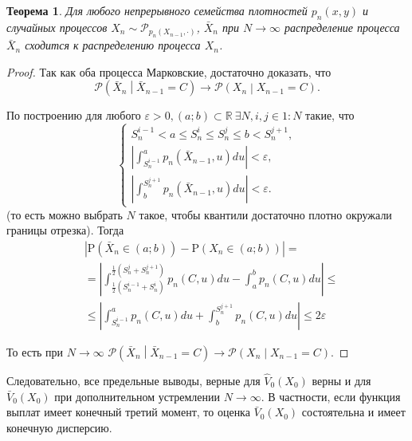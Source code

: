 \documentclass[specialist,
               substylefile = ../spbu.rtx,
               subf,href,colorlinks=true, 12pt]{disser}
\newtheorem{theorem}{Теорема}
\newcommand{\veps}{\varepsilon}
\newcommand{\prob}[1]{\mathrm{P}\left(#1\right)}
\newcommand{\R}{\ensuremath{\mathbb{R}}}
\newcommand{\Vhat}{\hat{V}}
\newcommand{\Vbar}{\bar{V}}
\begin{document}
    \begin{theorem}
        Для любого непрерывного семейства плотностей $p_n\left(x, y\right)$ и случайных процессов $X_n \sim \mathcal P_{p_n\left(X_{n-1}, \cdot\right)}$, $\bar X_n$ при $N\to\infty$ распределение процесса $\bar X_n$ сходится к распределению процесса $X_n$.
    \end{theorem}
    \begin{proof} 
        Так как оба процесса Марковские, достаточно доказать, что 
        $$\mathcal P\left(\bar X_n\middle\vert \bar X_{n-1} = C\right) \to \mathcal P\left(X_n\middle\vert X_{n-1} = C\right).$$

        По построению для любого $\veps > 0, \left( a; b\right) \subset \R \: \exists N, i, j \in 1\mathbin : N$ такие, что 
        $$ \begin{cases}
        S_n^{i-1} < a \leq S_n^i \leq S_n^j \leq b < S_n^{j+1}, \\
        \left\vert\int_{S_n^{i-1}}^a p_n\left(\bar X_{n-1}, u\right) du\right\vert < \veps, \\
        \left\vert\int_{b}^{S_n^{j+1}} p_n\left(\bar X_{n-1}, u\right) du \right\vert< \veps.
        \end{cases} $$
        (то есть можно выбрать $N$ такое, чтобы квантили достаточно плотно окружали границы отрезка). Тогда 
        \begin{align*}
            &\left\vert 
                \prob{\bar X_n \in \left( a; b\right)} - 
                \prob{X_n \in \left( a; b\right)} 
            \right\vert = \\ &= 
            \left\vert 
                \int_{\frac{1}{2}\left(S_n^{i-1} + S_n^{i}\right)}^{\frac{1}{2}\left(S_n^{j} + S_n^{j+1}\right)} p_n\left(C, u\right) du - \int_a^b p_n\left(C, u\right) du 
            \right\vert \leq \\ &\leq 
            \left\vert 
                \int_{S_n^{i-1}}^{a} p_n\left(C, u\right) du + \int_{b}^{S_n^{j+1}} p_n\left(C, u\right) du 
            \right\vert \leq 2\veps
        \end{align*}

        То есть при $N\to\infty$ $\mathcal P\left(\bar X_n\middle\vert \bar X_{n-1} = C\right) \to \mathcal P\left(X_n\middle\vert X_{n-1} = C\right)$.
    \end{proof}

    Следовательно, все предельные выводы, верные для $\Vhat_0(X_0)$ верны и для $\Vbar_0(X_0)$ при дополнительном устремлении $N\to\infty$. В частности, если функция выплат имеет конечный третий момент, то оценка $\Vbar_0(X_0)$ состоятельна и имеет конечную дисперсию.
\end{document}

